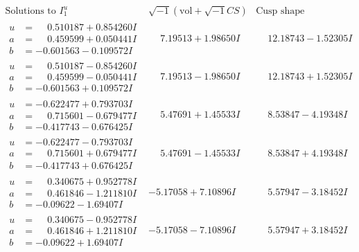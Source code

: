 \documentclass[1p]{elsarticle_modified}
\theoremstyle{definition}
\newcommand{\I}{\sqrt{-1}}
\begin{document}
$$\begin{array}{c|c|c}  
\text{Solutions to }I^u_{1}& \I (\text{vol} + \sqrt{-1}CS) & \text{Cusp shape}\\
 \hline 
\begin{aligned}
u &= \phantom{-}0.510187 + 0.854260 I \\
a &= \phantom{-}0.459599 + 0.050441 I \\
b &= -0.601563 - 0.109572 I\end{aligned}
 & \phantom{-}7.19513 + 1.98650 I & \phantom{-}12.18743 - 1.52305 I \\ \hline\begin{aligned}
u &= \phantom{-}0.510187 - 0.854260 I \\
a &= \phantom{-}0.459599 - 0.050441 I \\
b &= -0.601563 + 0.109572 I\end{aligned}
 & \phantom{-}7.19513 - 1.98650 I & \phantom{-}12.18743 + 1.52305 I \\ \hline\begin{aligned}
u &= -0.622477 + 0.793703 I \\
a &= \phantom{-}0.715601 - 0.679477 I \\
b &= -0.417743 - 0.676425 I\end{aligned}
 & \phantom{-}5.47691 + 1.45533 I & \phantom{-}8.53847 - 4.19348 I \\ \hline\begin{aligned}
u &= -0.622477 - 0.793703 I \\
a &= \phantom{-}0.715601 + 0.679477 I \\
b &= -0.417743 + 0.676425 I\end{aligned}
 & \phantom{-}5.47691 - 1.45533 I & \phantom{-}8.53847 + 4.19348 I \\ \hline\begin{aligned}
u &= \phantom{-}0.340675 + 0.952778 I \\
a &= \phantom{-}0.461846 - 1.211810 I \\
b &= -0.09622 - 1.69407 I\end{aligned}
 & -5.17058 + 7.10896 I & \phantom{-}5.57947 - 3.18452 I \\ \hline\begin{aligned}
u &= \phantom{-}0.340675 - 0.952778 I \\
a &= \phantom{-}0.461846 + 1.211810 I \\
b &= -0.09622 + 1.69407 I\end{aligned}
 & -5.17058 - 7.10896 I & \phantom{-}5.57947 + 3.18452 I \\ \hline\begin{aligned}

\end{aligned}
\end{array}$$
\end{document}
